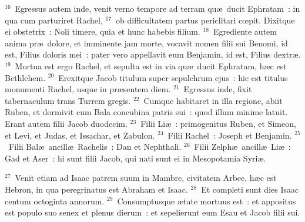 ${}^{16}$~Egressus autem inde, venit verno tempore ad terram qu\ae\ ducit Ephratam~: in qua cum parturiret Rachel,
${}^{17}$~ob difficultatem partus periclitari cœpit. Dixitque ei obstetrix~: Noli timere, quia et hunc habebis filium.
${}^{18}$~Egrediente autem anima pr\ae\ dolore, et imminente jam morte, vocavit nomen filii sui Benomi, id est, Filius doloris mei~: pater vero appellavit eum Benjamin, id est, Filius dextr\ae .
${}^{19}$~Mortua est ergo Rachel, et sepulta est in via qu\ae\ ducit Ephratam, h\ae c est Bethlehem.
${}^{20}$~Erexitque Jacob titulum super sepulchrum ejus~: hic est titulus monumenti Rachel, usque in pr\ae sentem diem.
${}^{21}$~Egressus inde, fixit tabernaculum trans Turrem gregis.
${}^{22}$~Cumque habitaret in illa regione, abiit Ruben, et dormivit cum Bala concubina patris sui~: quod illum minime latuit. Erant autem filii Jacob duodecim.
${}^{23}$~Filii Li\ae~: primogenitus Ruben, et Simeon, et Levi, et Judas, et Issachar, et Zabulon.
${}^{24}$~Filii Rachel~: Joseph et Benjamin.
${}^{25}$~Filii Bal\ae\ ancill\ae\ Rachelis~: Dan et Nephthali.
${}^{26}$~Filii Zelph\ae\ ancill\ae\ Li\ae~: Gad et Aser~: hi sunt filii Jacob, qui nati sunt ei in Mesopotamia Syri\ae .


${}^{27}$~Venit etiam ad Isaac patrem suum in Mambre, civitatem Arbee, h\ae c est Hebron, in qua peregrinatus est Abraham et Isaac.
${}^{28}$~Et completi sunt dies Isaac centum octoginta annorum.
${}^{29}$~Consumptusque \ae tate mortuus est~: et appositus est populo suo senex et plenus dierum~: et sepelierunt eum Esau et Jacob filii sui.

